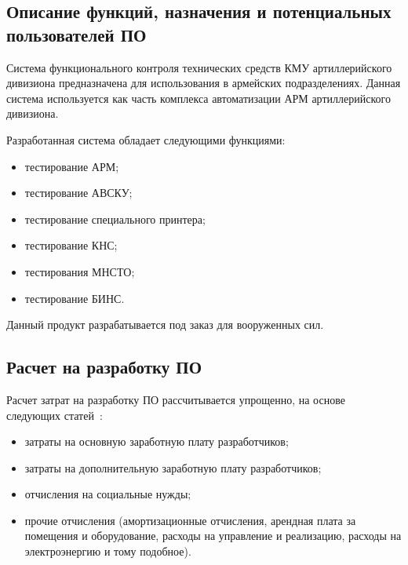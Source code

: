


\FPeval{\cleanProfitDevExact}{\productPrice - \ndsExact - \totalExpensesExact}






\subsection{Описание функций, назначения и потенциальных пользователей ПО}

Система функционального контроля технических средств КМУ артиллерийского дивизиона предназначена для использования в
армейских подразделениях. Данная система используется как часть комплекса автоматизации АРМ артиллерийского дивизиона.

Разработанная система обладает следующими функциями:
\begin{itemize}
		\item тестирование АРМ;
		\item тестирование АВСКУ;
		\item тестирование специального принтера;
		\item тестирование КНС;
		\item тестирования МНСТО;
		\item тестирование БИНС.
\end{itemize}

Данный продукт разрабатывается под заказ для вооруженных сил.

\subsection{Расчет на разработку ПО}

Расчет затрат на разработку ПО рассчитывается упрощенно, на основе следующих статей~\cite{economics_diploma}:
\begin{itemize}
	\item затраты на основную заработную плату разработчиков;
	\item затраты на дополнительную заработную плату разработчиков;
	\item отчисления на социальные нужды;
	\item прочие отчисления (амортизационные отчисления, арендная плата за помещения и
		оборудование, расходы на управление и реализацию, расходы на электроэнергию и тому подобное).
\end{itemize}

